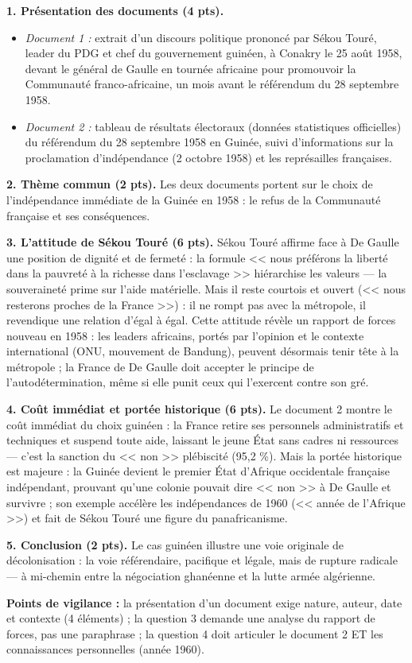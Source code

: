 \documentclass[11pt]{article}
\newcommand{\cle}[1]{{\popxbold\color{popdark}#1}}
\begin{document}
\begin{corrige}
\textbf{1. Présentation des documents (4 pts).}
\begin{itemize}
\item \emph{Document 1 :} extrait d'un discours politique prononcé par \cle{Sékou Touré}, leader du PDG et chef du gouvernement guinéen, à Conakry le 25 août 1958, devant le général de Gaulle en tournée africaine pour promouvoir la Communauté franco-africaine, un mois avant le référendum du 28 septembre 1958.
\item \emph{Document 2 :} tableau de résultats électoraux (données statistiques officielles) du référendum du 28 septembre 1958 en Guinée, suivi d'informations sur la proclamation d'indépendance (2 octobre 1958) et les représailles françaises.
\end{itemize}

\textbf{2. Thème commun (2 pts).} Les deux documents portent sur le choix de l'indépendance immédiate de la Guinée en 1958 : le refus de la Communauté française et ses conséquences.

\textbf{3. L'attitude de Sékou Touré (6 pts).} Sékou Touré affirme face à De Gaulle une position de dignité et de fermeté : la formule << nous préférons la liberté dans la pauvreté à la richesse dans l'esclavage >> hiérarchise les valeurs — la souveraineté prime sur l'aide matérielle. Mais il reste courtois et ouvert (<< nous resterons proches de la France >>) : il ne rompt pas avec la métropole, il revendique une relation d'égal à égal. Cette attitude révèle un rapport de forces nouveau en 1958 : les leaders africains, portés par l'opinion et le contexte international (ONU, mouvement de Bandung), peuvent désormais tenir tête à la métropole ; la France de De Gaulle doit accepter le principe de l'autodétermination, même si elle punit ceux qui l'exercent contre son gré.

\textbf{4. Coût immédiat et portée historique (6 pts).} Le document 2 montre le coût immédiat du choix guinéen : la France retire ses personnels administratifs et techniques et suspend toute aide, laissant le jeune État sans cadres ni ressources — c'est la sanction du << non >> plébiscité (95,2 \%). Mais la portée historique est majeure : la Guinée devient le premier État d'Afrique occidentale française indépendant, prouvant qu'une colonie pouvait dire << non >> à De Gaulle et survivre ; son exemple accélère les indépendances de 1960 (<< année de l'Afrique >>) et fait de Sékou Touré une figure du panafricanisme.

\textbf{5. Conclusion (2 pts).} Le cas guinéen illustre une voie originale de décolonisation : la voie référendaire, pacifique et légale, mais de rupture radicale — à mi-chemin entre la négociation ghanéenne et la lutte armée algérienne.

\textbf{Points de vigilance :} la présentation d'un document exige nature, auteur, date et contexte (4 éléments) ; la question 3 demande une analyse du rapport de forces, pas une paraphrase ; la question 4 doit articuler le document 2 ET les connaissances personnelles (année 1960).
\end{corrige}
\end{document}
